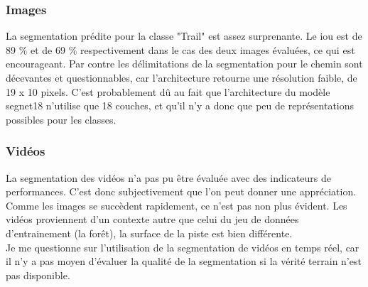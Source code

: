\subsubsection{Images}
La segmentation prédite pour la classe "Trail" est assez surprenante. Le \acrshort{iou} est de 89 \% et de 69 \% respectivement dans le cas des deux images évaluées, ce qui est encourageant. Par contre les délimitations de la segmentation pour le chemin sont décevantes et questionnables, car l'architecture retourne une résolution faible, de 19 x 10 pixels. C'est probablement dû au fait que l'architecture du modèle segnet18 n'utilise que 18 couches, et qu'il n'y a donc que peu de représentations possibles pour les classes. 
\subsubsection{Vidéos}
La segmentation des vidéos n'a pas pu être évaluée avec des indicateurs de performances. C'est donc subjectivement que l'on peut donner une appréciation. Comme les images se succèdent rapidement, ce n'est pas non plus évident. Les vidéos proviennent d'un contexte autre que celui du jeu de données d'entrainement (la forêt), la surface de la piste est bien différente. 
\vspace{0.5\baselineskip}
\\
\noindent Je me questionne sur l'utilisation de la segmentation de vidéos en temps réel, car il n'y a pas moyen d'évaluer la qualité de la segmentation si la vérité terrain n'est pas disponible.